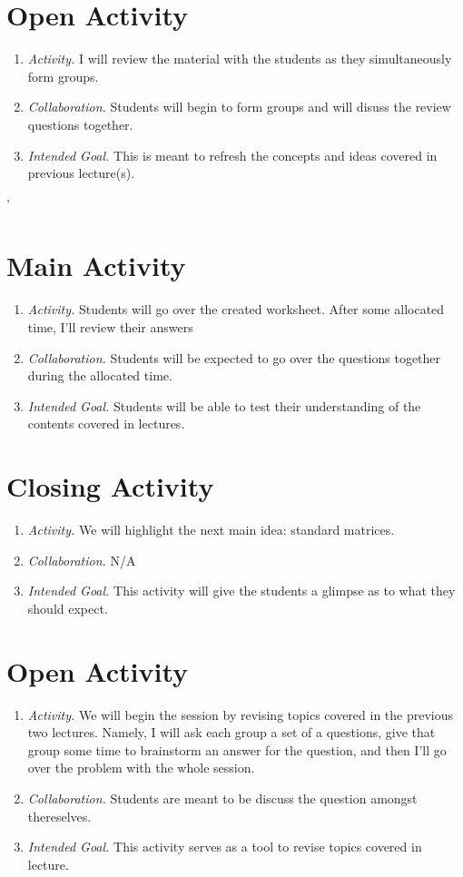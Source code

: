 \documentclass[11pt]{article}
\begin{document}
\section{\centering Open Activity}
	\begin{enumerate}
		\item \textit{Activity.} I will review the material with the students as they simultaneously form groups.
		\item \textit{Collaboration.} Students will begin to form groups and will disuss the review questions together.
		\item \textit{Intended Goal.} This is meant to refresh the concepts and ideas covered in previous lecture(s).
	\end{enumerate}'

\section{\centering Main Activity}
	\begin{enumerate}
		\item \textit{Activity.} Students will go over the created worksheet. After some allocated time, I'll review their answers
		\item \textit{Collaboration.} Students will be expected to go over the questions together during the allocated time.
		\item \textit{Intended Goal.} Students will be able to test their understanding of the contents covered in lectures.
	\end{enumerate}
\section{\centering Closing Activity}
	\begin{enumerate}
		\item \textit{Activity.} We will highlight the next main idea: standard matrices.
		\item \textit{Collaboration.} N/A
		\item \textit{Intended Goal.} This activity will give the students a glimpse as to what they should expect.
	\end{enumerate}

\newpage
{}
\section{\centering Open Activity}
	\begin{enumerate}
		\item \textit{Activity.} We will begin the session by revising topics covered in the previous two lectures. Namely, I will ask each group a set of a
						questions, give that group some time to brainstorm an answer for the question, and then I'll go over the problem with the whole
						session.
		\item \textit{Collaboration.} Students are meant to be discuss the question amongst thereselves.
		\item \textit{Intended Goal.} This activity serves as a tool to revise topics covered in lecture.
	\end{enumerate}
\end{document}
